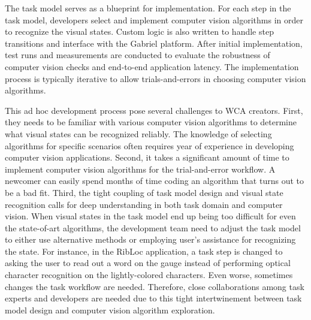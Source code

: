 The task model serves as a blueprint for implementation. For each step in the
task model, developers select and implement computer vision algorithms in order
to recognize the visual states. Custom logic is also written to handle step
transitions and interface with the Gabriel platform. After initial
implementation, test runs and measurements are conducted to evaluate the
robustness of computer vision checks and end-to-end application latency. The
implementation process is typically iterative to allow trials-and-errors in
choosing computer vision algorithms.

This ad hoc development process pose several challenges to WCA creators. First,
they needs to be familiar with various computer vision algorithms to determine
what visual states can be recognized reliably. The knowledge of selecting
algorithms for specific scenarios often requires year of experience in
developing computer vision applications. Second, it takes a significant amount
of time to implement computer vision algorithms for the trial-and-error
workflow. A newcomer can easily spend months of time coding an algorithm that
turns out to be a bad fit. Third, the tight coupling of task model design and
visual state recognition calls for deep understanding in both task domain and
computer vision. When visual states in the task model end up being too difficult
for even the state-of-art algorithms, the development team need to adjust the
task model to either use alternative methods or employing user's assistance for
recognizing the state. For instance, in the RibLoc application, a task step is
changed to asking the user to read out a word on the gauge instead of performing
optical character recognition on the lightly-colored characters. Even worse,
sometimes changes the task workflow are needed. Therefore, close collaborations
among task experts and developers are needed due to this tight intertwinement
between task model design and computer vision algorithm exploration. 


